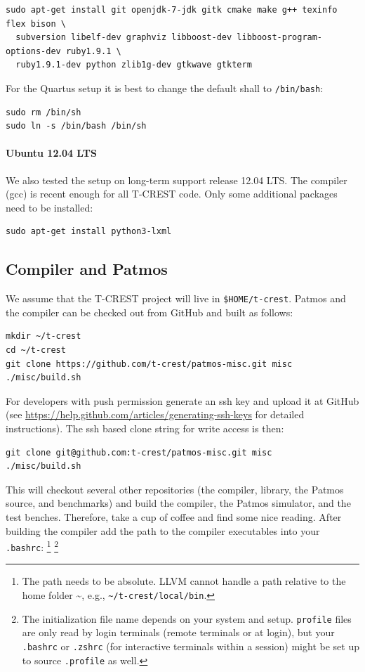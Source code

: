 \documentclass[a4paper,fontsize=10pt,twoside,DIV15,BCOR12mm,headinclude=true,footinclude=false,pagesize,bibtotoc]{scrbook}
\newcommand{\code}[1]{{\texttt{#1}}}
\begin{document}
\begin{verbatim}
sudo apt-get install git openjdk-7-jdk gitk cmake make g++ texinfo flex bison \
  subversion libelf-dev graphviz libboost-dev libboost-program-options-dev ruby1.9.1 \
  ruby1.9.1-dev python zlib1g-dev gtkwave gtkterm
\end{verbatim}

For the Quartus setup it is best to change the default shall to \code{/bin/bash}:

\begin{verbatim}
sudo rm /bin/sh
sudo ln -s /bin/bash /bin/sh
\end{verbatim}

\paragraph{Ubuntu 12.04 LTS}

We also tested the setup on long-term support release 12.04 LTS. The compiler
(gcc) is recent enough for all T-CREST code. Only some additional packages need to
be installed:

\begin{verbatim}
sudo apt-get install python3-lxml
\end{verbatim}

\subsection{Compiler and Patmos}
\label{sec:build:compiler}

We assume that the T-CREST project will live in \code{\$HOME/t-crest}.
Patmos and the compiler can be checked out from GitHub and built as follows:

\begin{verbatim}
mkdir ~/t-crest
cd ~/t-crest
git clone https://github.com/t-crest/patmos-misc.git misc
./misc/build.sh
\end{verbatim}

For developers with push permission generate an ssh key and upload
it at GitHub (see \url{https://help.github.com/articles/generating-ssh-keys}
for detailed instructions).
The ssh based clone string for write access is then:

\begin{verbatim}
git clone git@github.com:t-crest/patmos-misc.git misc
./misc/build.sh
\end{verbatim}

This will checkout several other repositories (the compiler, library,
the Patmos source, and benchmarks) and
build the compiler, the Patmos simulator, and the test benches.
Therefore, take a cup of coffee and find some nice reading.
After building the compiler add the path
to the compiler executables into your \code{.bashrc}:
\footnote{The path needs to be absolute. LLVM cannot handle
a path relative to the home folder \textasciitilde{}, e.g., \code{\textasciitilde{}/t-crest/local/bin}.}
\footnote{The initialization file name depends on your system and setup. \code{profile} files are only read by login
terminals (remote terminals or at login), but your \code{.bashrc} or \code{.zshrc} (for interactive terminals within a
session) might be set up to source \code{.profile} as well.}
\end{document}
